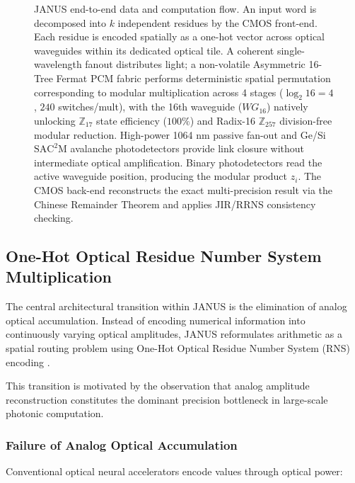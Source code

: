 \documentclass[journal]{IEEEtran}
\begin{document}
\begin{figure}[!t]
\caption{JANUS end-to-end data and computation flow. An input word is decomposed into $k$ independent residues by the CMOS front-end. Each residue is encoded spatially as a one-hot vector across optical waveguides within its dedicated optical tile. A coherent single-wavelength fanout distributes light; a non-volatile Asymmetric 16-Tree Fermat PCM fabric performs deterministic spatial permutation corresponding to modular multiplication across 4 stages ($\log_2 16 = 4$, $240$ switches/mult), with the 16th waveguide ($WG_{16}$) natively unlocking $\mathbb{Z}_{17}$ state efficiency ($100\%$) and Radix-16 $\mathbb{Z}_{257}$ division-free modular reduction. High-power 1064 nm passive fan-out and Ge/Si $\mathrm{SAC^2M}$ avalanche photodetectors provide link closure without intermediate optical amplification. Binary photodetectors read the active waveguide position, producing the modular product $z_i$. The CMOS back-end reconstructs the exact multi-precision result via the Chinese Remainder Theorem and applies JIR/RRNS consistency checking.}
\label{fig:janus_dataflow}
\end{figure}


\subsection{\textbf{One-Hot Optical Residue Number System Multiplication}}

The central architectural transition within JANUS is the elimination of analog optical accumulation. Instead of encoding numerical information into continuously varying optical amplitudes, JANUS reformulates arithmetic as a spatial routing problem using One-Hot Optical Residue Number System (RNS) encoding \cite{Omosanya2021}\cite{Huang1979}\cite{Sorger2018}.

This transition is motivated by the observation that analog amplitude reconstruction constitutes the dominant precision bottleneck in large-scale photonic computation.

\subsubsection{\textbf{Failure of Analog Optical Accumulation}}

Conventional optical neural accelerators encode values through optical power:
\end{document}
